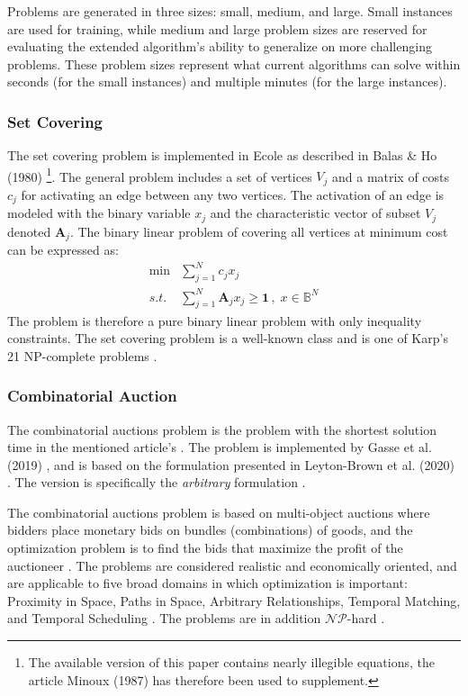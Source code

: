 Problems are generated in three sizes: small, medium, and large. Small instances are used for training, while medium and large problem sizes are reserved for evaluating the extended algorithm's ability to generalize on more challenging problems. These problem sizes represent what current algorithms can solve within seconds (for the small instances) and multiple minutes (for the large instances).


\subsubsection{Set Covering}

The set covering problem is implemented in \gls{Ecole} as described in Balas \& Ho (1980) \cite{balas1980set} \footnote{The available version of this paper contains nearly illegible equations, the article Minoux (1987) \cite{minoux1987class} has therefore been used to supplement.}. The general problem includes a set of vertices $V_j$ and a matrix of costs $c_j$ for activating an edge between any two vertices. The activation of an edge is modeled with the binary variable $x_j$ and the characteristic vector of subset $V_j$ denoted $\textbf{A}_j$. The binary linear problem of covering all vertices at minimum cost can be expressed as: 
\begin{align}
    \min &\sum_{j=1}^N c_j x_j \\ s.t. \; &\sum_{j=1}^N \mathbf{A}_j x_j \geq \mathbf{1} \,,\; x \in \mathbb{B}^N 
\end{align}
The problem is therefore a pure binary linear problem with only inequality constraints. The set covering problem is a well-known class and is one of Karp's 21 \gls{NP}-complete problems \cite{karp1972reducibility}.  

\subsubsection{Combinatorial Auction}

The combinatorial auctions problem is the problem with the shortest solution time in the mentioned article's \cite{gasse2019exact,gupta2020hybrid}. The problem is implemented by Gasse et al. (2019) \cite{gasse2019exact}, and is based on the formulation presented in Leyton-Brown et al. (2020) \cite{brown2000towards}. The version is specifically the \textit{arbitrary} formulation \cite{brown2000towards}.  

The combinatorial auctions problem is based on multi-object auctions where bidders place monetary bids on bundles (combinations) of goods, and the optimization problem is to find the bids that maximize the profit of the auctioneer \cite{brown2000towards}. The problems are considered realistic and economically oriented, and are applicable to five broad domains in which optimization is important: Proximity in Space, Paths in Space, Arbitrary Relationships, Temporal Matching, and Temporal Scheduling \cite{brown2000towards}. The problems are in addition $\mathcal{NP}$-hard \cite{dong2012combinatorial}. 

